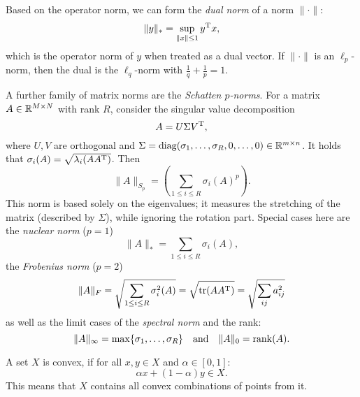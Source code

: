 \documentclass{article}
\begin{document}
Based on the operator norm, we can form the \emph{dual norm} of a norm \(\lVert \cdot \rVert\):
\begin{equation*}
  \lVert y \rVert_{*} = \sup_{\lVert x \rVert \leq 1} y^{\mathrm{T}} x,
\end{equation*}
which is the operator norm of \(y\) when treated as a dual vector.  If \(\lVert \cdot \rVert\) is an
\(\ell_p\)-norm, then the dual is the \(\ell_q\)-norm with \(\frac{1}{q} + \frac{1}{p} = 1\).

A further family of matrix norms are the \emph{Schatten \(p\)-norms}.  For a matrix \(A \in
\mathbb{R}^{M \times N}\) with rank \(R\), consider the singular value decomposition
\begin{equation*}
  A = U \Sigma V^{\mathrm{T}},
\end{equation*}
where \(U, V\) are orthogonal and
\(\Sigma = \operatorname{diag}(\sigma_1, \ldots, \sigma_R, 0, \ldots, 0) \in \mathbb{R}^{m \times n}\).  It holds that
\(\sigma_i(A) = \sqrt{\lambda_i(A A^{\mathrm{T}})}\).  Then
\begin{equation*}
  \lVert A \rVert_{S_p} = \left( \sum_{1 \leq i \leq R} \sigma_i(A)^p \right).
\end{equation*}
This norm is based solely on the eigenvalues; it measures the stretching of the matrix (described by
\(\Sigma\)), while ignoring the rotation part.  Special cases here are the \emph{nuclear norm}
(\(p = 1\))
\begin{equation*}
  \lVert A \rVert_{*} = \sum_{1 \leq i \leq R} \sigma_i(A),
\end{equation*}
the \emph{Frobenius norm} (\(p = 2\))
\begin{equation*}
  \lVert A \rVert_{F} = \sqrt{\sum_{1 \leq i \leq R} \sigma_i^2(A)}
    = \sqrt{\operatorname{tr}(AA^{\mathrm{T}})} = \sqrt{\sum_{ij} a_{ij}^2}
\end{equation*}
as well as the limit cases of the \emph{spectral norm} and the rank:
\begin{equation*}
  \lVert A \rVert_{\infty} = \max\{\sigma_1, \ldots, \sigma_R\} \quad \text{and} \quad
  \lVert A \rVert_{0} = \operatorname{rank}(A).
\end{equation*}

\label{s:convex_sets}

A set \(X\) is convex, if for all \(x, y \in X\) and \(\alpha \in [0,1]\):
\begin{equation*}
  \alpha x + (1 - \alpha) y \in X.
\end{equation*}
This means that \(X\) contains all convex combinations of points from it.
\end{document}

